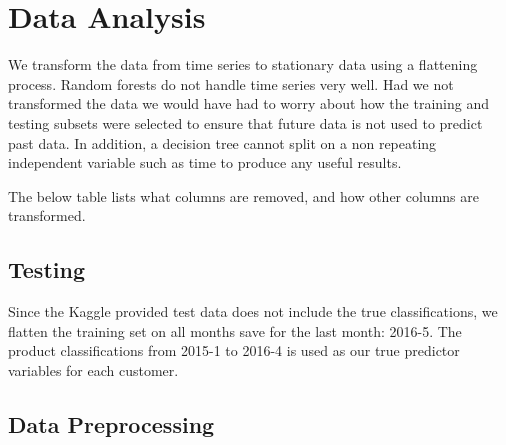 \documentclass[10pt]{article}
\begin{document}
\section{Data Analysis}

We transform the data from time series to stationary data using a flattening process. Random forests do not handle time series very well. Had we not transformed the data we would have had to worry about how the training and testing subsets were selected to ensure that future data is not used to predict past data. In addition, a decision tree cannot split on a non repeating independent variable such as time to produce any useful results.

The below table lists what columns are removed, and how other columns are transformed.


\subsection{Testing}
Since the Kaggle provided test data does not include the true classifications, we flatten the training set on all months save for the last month: 2016-5. The product classifications from 2015-1 to 2016-4 is used as our true predictor variables for each customer.

\subsection{Data Preprocessing}
\end{document}
